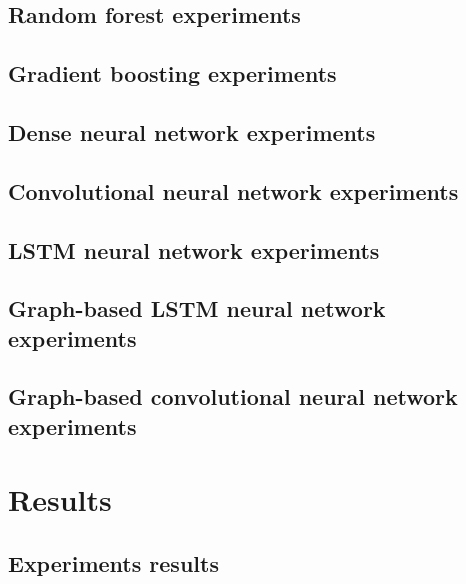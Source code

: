 \subsection{Random forest experiments}
\subsection{Gradient boosting experiments}
\subsection{Dense neural network experiments}
\subsection{Convolutional neural network experiments}
\subsection{LSTM neural network experiments}
\subsection{Graph-based LSTM neural network experiments}
\subsection{Graph-based convolutional neural network experiments}



\section{Results} \label{sec: results}

\subsection{Experiments results}

